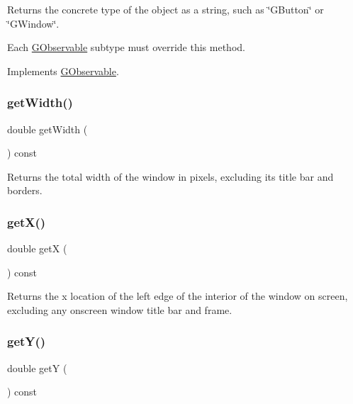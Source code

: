 Returns the concrete type of the object as a string, such as {\ttfamily \char`\"{}\+G\+Button\char`\"{}} or {\ttfamily \char`\"{}\+G\+Window\char`\"{}}. 

Each \mbox{\hyperlink{classGObservable}{G\+Observable}} subtype must override this method. 

Implements \mbox{\hyperlink{classGObservable_a799e073a127b428cc841086d42ea4fed}{G\+Observable}}.

\mbox{\label{classGWindow_a0ed2965abd4f5701d2cadf71239faf19}} 
\subsubsection{\texorpdfstring{get\+Width()}{getWidth()}}
{\footnotesize\ttfamily double get\+Width (\begin{DoxyParamCaption}{ }\end{DoxyParamCaption}) const\hspace{0.3cm}{\ttfamily [virtual]}}



Returns the total width of the window in pixels, excluding its title bar and borders. 

\mbox{\label{classGWindow_a344385751bee0720059403940d57a13e}} 
\subsubsection{\texorpdfstring{get\+X()}{getX()}}
{\footnotesize\ttfamily double getX (\begin{DoxyParamCaption}{ }\end{DoxyParamCaption}) const\hspace{0.3cm}{\ttfamily [virtual]}}



Returns the x location of the left edge of the interior of the window on screen, excluding any onscreen window title bar and frame. 

\mbox{\label{classGWindow_aafa51c7f8f38a09febbb9ce7853f77b4}} 
\subsubsection{\texorpdfstring{get\+Y()}{getY()}}
{\footnotesize\ttfamily double getY (\begin{DoxyParamCaption}{ }\end{DoxyParamCaption}) const\hspace{0.3cm}{\ttfamily [virtual]}}



